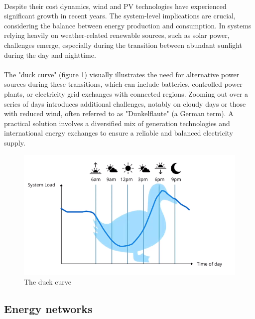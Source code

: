 \documentclass[../summary.tex]{subfiles}
\begin{document}
\ \\
Despite their cost dynamics, wind and PV technologies have experienced significant growth in recent years. The system-level implications are crucial, considering the balance between energy production and consumption. In systems relying heavily on weather-related renewable sources, such as solar power, challenges emerge, especially during the transition between abundant sunlight during the day and nighttime.\\
\\
The "duck curve" (figure \ref{fig:duckcurve}) visually illustrates the need for alternative power sources during these transitions, which can include batteries, controlled power plants, or electricity grid exchanges with connected regions. Zooming out over a series of days introduces additional challenges, notably on cloudy days or those with reduced wind, often referred to as "Dunkelflaute" (a German term). A practical solution involves a diversified mix of generation technologies and international energy exchanges to ensure a reliable and balanced electricity supply.

\begin{figure}[H]
	\centering
	\includegraphics[width=0.7\linewidth]{../images/duck_curve}
	\caption{The duck curve}
	\label{fig:duckcurve}
\end{figure}

\subsection{Energy networks}
\end{document}
